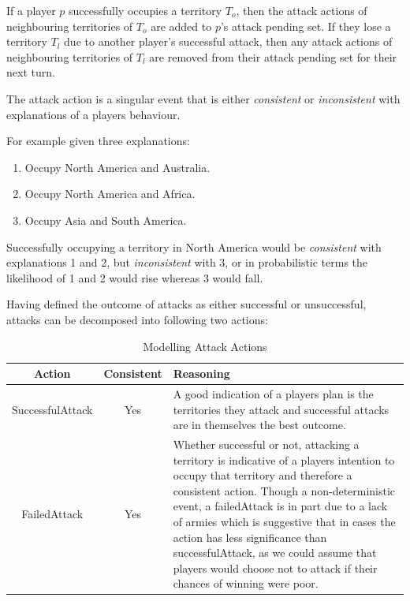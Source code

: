 \documentclass[parskip]{cs4rep}
\begin{document}
If a player $p$ successfully occupies a territory $T_{o}$, then the attack actions of neighbouring territories of $T_{o}$ are added to $p$'s attack pending set. If they lose a territory $T_{l}$ due to another player's successful attack, then any attack actions of neighbouring territories of $T_{l}$ are removed from their attack pending set for their next turn. 

The attack action is a singular event that is either \textit{consistent} or \textit{inconsistent} with explanations of a players behaviour. 

For example given three explanations:

\begin{enumerate}
\item
Occupy North America and Australia.
\item
Occupy North America and Africa.
\item
Occupy Asia and South America.
\end{enumerate}

Successfully occupying a territory in North America would be \textit{consistent} with explanations 1 and 2, but \textit{inconsistent} with 3, or in probabilistic terms the likelihood of 1 and 2 would rise whereas 3 would fall.

Having defined the outcome of attacks as either successful or unsuccessful, attacks can be decomposed into following two actions: 

\begin{table}[ht]
\centering
\begin{tabular}{|c|c|p{8cm}|}
\hline 
\textbf{Action} & \textbf{Consistent}  & \textbf{Reasoning} \\ 
\hline 
SuccessfulAttack & Yes & A good indication of a players plan is the territories they attack and successful attacks are in themselves the best outcome. \\ 
\hline 
FailedAttack & Yes & Whether successful or not, attacking a territory is indicative of a players intention to occupy that territory and therefore a consistent action. Though a non-deterministic event, a failedAttack is in part due to a lack of armies which is suggestive that in cases the action has less significance than successfulAttack, as we could assume that players would choose not to attack if their chances of winning were poor.\\ 
\hline
\end{tabular}
\caption{Modelling Attack Actions}
\label{table:attack-modelling}
\end{table}
\end{document}
